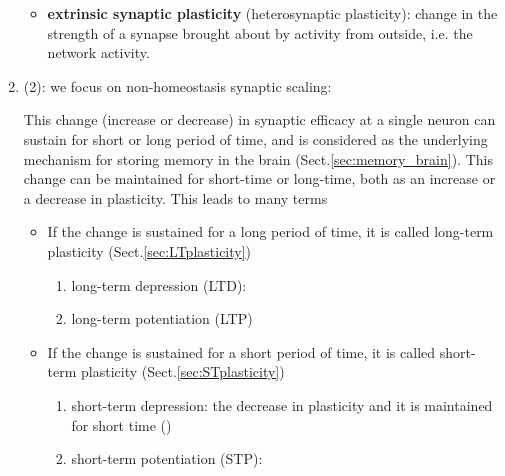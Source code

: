 \begin{enumerate}
\begin{mdframed}
\begin{itemize}
  \item {\bf extrinsic synaptic plasticity} (heterosynaptic plasticity):
   change in the strength of a synapse brought about by activity from
   outside, i.e. the network activity. %
   
\end{itemize}
\end{mdframed}

  \item (2): we focus on non-homeostasis synaptic scaling:


This change (increase or decrease) in synaptic efficacy at a
single neuron can sustain for short or long period of time, and is considered as
the underlying mechanism for storing memory in the brain
(Sect.\ref{sec:memory_brain}). This change can be maintained for short-time or
long-time, both as an increase or a decrease in plasticity. This leads to many
terms
\begin{itemize}
  \item If the change is sustained for a long period of time, it is called
  long-term plasticity (Sect.\ref{sec:LTplasticity})
\begin{enumerate}
 
  \item long-term depression (LTD):
  
  \item long-term potentiation (LTP)

\end{enumerate}
  
  \item If the change is sustained for a short period of time, it is called
  short-term plasticity (Sect.\ref{sec:STplasticity})
\begin{enumerate}
  \item short-term depression: the decrease in plasticity and it is maintained
  for short time ()
  
  \item short-term potentiation (STP):
 \end{enumerate}
\end{itemize}  
\end{enumerate}


